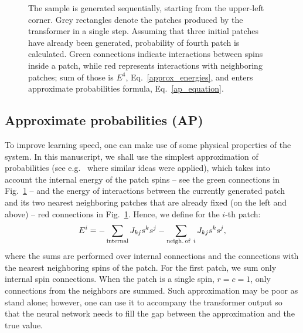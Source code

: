 \documentclass[3p, times,merge]{elsarticle}
\begin{document}
\begin{figure}
    \caption{The sample is generated sequentially, starting from the upper-left corner. Grey rectangles denote the patches produced by the transformer in a single step. Assuming that three initial patches have already been generated, probability of fourth patch is calculated. Green connections indicate interactions between spins inside a patch, while red represents interactions with neighboring patches; sum of those is $E^4$, Eq.~\ref{approx_energies}, and enters approximate probabilities formula, Eq.~\ref{ap_equation}.}
    \label{fig:patches}
\end{figure}



\subsection{Approximate probabilities (AP)}
\label{AP_section}

To improve learning speed, one can make use of some physical properties of  the system. In this manuscript, we shall use the simplest approximation of probabilities (see e.g.~\cite{Biazzo_2023} where similar ideas were applied), which takes into account the internal energy of the patch spins -- see the green connections in Fig.~\ref{fig:patches} -- and the energy of interactions between the currently generated patch and its two nearest neighboring patches that are already fixed (on the left and above) -- red connections in Fig.~\ref{fig:patches}. Hence, we define for the $i$-th patch: 
\begin{equation}
E^i= - \sum_{{\rm internal}} J_{kj} s^k s^j - \sum_{{\rm neigh. \, of} \ i} J_{kj} s^k s^j,    
\label{approx_energies}
\end{equation}
where the sums are performed over internal connections and the connections with the nearest neighboring spins of the patch. For the first patch, we sum only internal spin connections. When the patch is a single spin, $r=c=1$, only connections from the neighbors are summed. Such approximation may be poor as stand alone; however, one can use it to accompany the transformer output so that the neural network needs to fill the gap between the approximation and the true value. 
\end{document}
